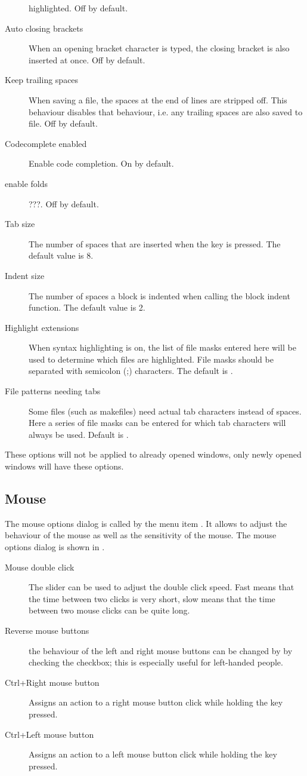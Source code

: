 \begin{description}
highlighted. Off by default.
\item[Auto closing brackets]
When an opening bracket character is typed, the closing bracket is also
inserted at once. Off by default.
\item[Keep trailing spaces]
When saving a file, the spaces at the end of lines are stripped off. This
behaviour disables that behaviour, i.e. any trailing spaces are also saved
to file. Off by default.
\item[Codecomplete enabled]
Enable code completion. On by default.
\item[enable folds]
???. Off by default.
\item[Tab size]
The number of spaces that are inserted when the  key is pressed.
The default value is 8.
\item[Indent size]
The number of spaces a block is indented when calling the block indent function.
The default value is 2.
\item[Highlight extensions]
When syntax highlighting is on, the list of file masks entered here will be
used to determine which files are highlighted. File masks should be
separated with semicolon (;) characters. The default is
.
\item[File patterns needing tabs]
Some files (such as makefiles) need actual tab characters instead of spaces. 
Here a series of file masks can be entered for which tab characters will
always be used. Default is .
\end{description}
\begin{remark}
These options will not be applied to already opened windows, only newly
opened windows will have these options.
\end{remark}
%
%
\subsection{Mouse}
\label{se:prefmouse}
The mouse options dialog is called by the menu item
. It allows to adjust the behaviour of the
mouse as well as the sensitivity of the mouse.
The mouse options dialog is shown in .


\begin{description}
\item[Mouse double click]
The slider can be used to adjust the double click speed. Fast means that the
time between two clicks is very short, slow means that the time between two
mouse clicks can be quite long.
\item[Reverse mouse buttons]
the behaviour of the left and right mouse buttons can be changed by
by checking the checkbox; this is especially useful for left-handed people.
\item[Ctrl+Right mouse button]
Assigns an action to a right mouse button click while holding the 
 key pressed.
\item[Ctrl+Left mouse button]
Assigns an action to a left mouse button click while holding the 
 key pressed.
\end{description}


